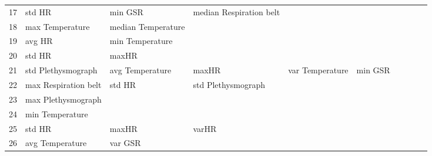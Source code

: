\begin{landscape}
\begin{table}[]
\begin{tabular}{l|llllllll}
17       & std HR                  & min GSR               & median Respiration belt &                         &                         &                       &                      &          &                      &        \\
18       & max Temperature         & median Temperature    &                         &                         &                         &                       &                      &          &                      &        \\
19       & avg HR                  & min Temperature       &                         &                         &                         &                       &                      &          &                      &        \\
20       & std HR                  & maxHR                 &                         &                         &                         &                       &                      &          &                      &        \\
21       & std Plethysmograph      & avg Temperature       & maxHR                   & var Temperature         & min GSR                 &                       &                      &          &                      &        \\
22       & max Respiration belt    & std HR                & std Plethysmograph      &                         &                         &                       &                      &          &                      &        \\
23       & max Plethysmograph      &                       &                         &                         &                         &                       &                      &          &                      &        \\
24       & min Temperature         &                       &                         &                         &                         &                       &                      &          &                      &        \\
25       & std HR                  & maxHR                 & varHR                   &                         &                         &                       &                      &          &                      &        \\
26       & avg Temperature         & var GSR               &                         &                         &                         &                       &                      &          &                      &        \\

\end{tabular}
\end{table}
\end{landscape}
